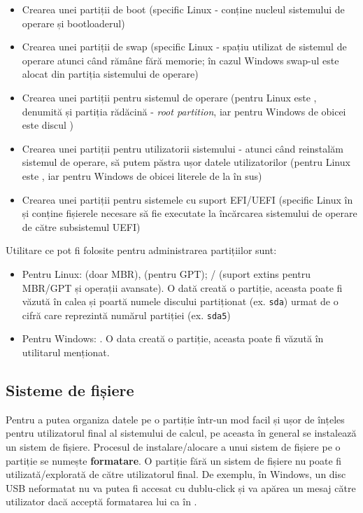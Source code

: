 \begin{itemize}
  \item Crearea unei partiții de boot (specific Linux  - conține nucleul sistemului de operare și bootloaderul)
  \item Crearea unei partiții de swap (specific Linux - spațiu utilizat de sistemul de operare atunci când rămâne fără memorie;
în cazul Windows swap-ul este alocat din partiția sistemului de operare)
  \item Crearea unei partiții pentru sistemul de operare (pentru Linux este \file{/}, denumită și partiția rădăcină - \textit{root partition}, iar pentru Windows de obicei este discul )
  \item Crearea unei partiții pentru utilizatorii sistemului - atunci când reinstalăm sistemul de operare, să putem păstra ușor datele utilizatorilor (pentru Linux este , iar pentru Windows de obicei literele de la  în sus)
  \item Crearea unei partiții pentru sistemele cu suport EFI/UEFI (specific Linux în  și conține fișierele necesare să fie executate la încărcarea sistemului de operare de către subsistemul UEFI)
\end{itemize}

Utilitare ce pot fi folosite pentru administrarea partițiilor sunt:

\begin{itemize}
  \item Pentru Linux:  (doar MBR),  (pentru GPT);
    / (suport extins pentru MBR/GPT și operații avansate).
    O dată creată o partiție, aceasta poate fi văzută în calea  și poartă numele discului partiționat (ex. \texttt{sda}) urmat de o cifră care reprezintă numărul partiției (ex. \texttt{sda5})
  \item Pentru Windows: .
    O data creată o partiție, aceasta poate fi văzută în utilitarul menționat.
\end{itemize}

\subsection{Sisteme de fișiere}
\label{sec:storage:fs}

Pentru a putea organiza datele pe o partiție într-un mod facil și ușor de înțeles pentru utilizatorul final al sistemului de calcul, pe aceasta în general se instalează un sistem de fișiere.
Procesul de instalare/alocare a unui sistem de fișiere pe o partiție se numește \textbf{formatare}.
O partiție fără un sistem de fișiere nu poate fi utilizată/explorată de către utilizatorul final.
De exemplu, în Windows, un disc USB neformatat nu va putea fi accesat cu dublu-click și va apărea un mesaj către utilizator dacă acceptă formatarea lui ca în .

